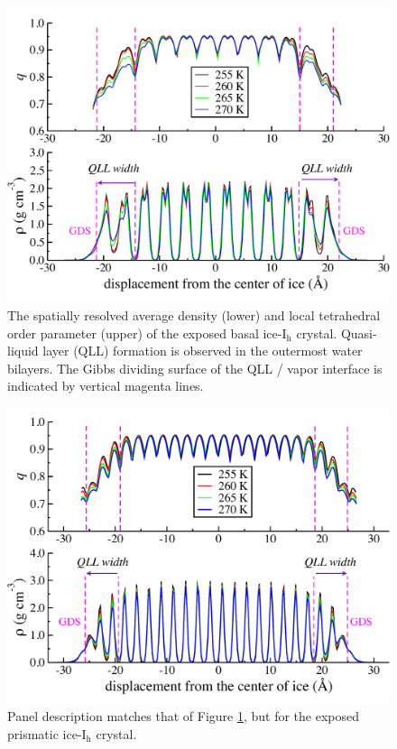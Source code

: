 \begin{figure}
\includegraphics[width=\linewidth]{Figures/basal_qdens}
\caption{\label{fig:basal_rhoq} The spatially resolved average density
  (lower) and local tetrahedral order parameter (upper) of the
  exposed basal ice-I$_\mathrm{h}$ crystal. Quasi-liquid layer (QLL)
  formation is observed in the outermost water bilayers. The Gibbs
  dividing surface of the QLL / vapor interface is indicated by
  vertical magenta lines. }
\end{figure}                


\begin{figure}
\includegraphics[width=\linewidth]{Figures/prism_qdens}
\caption{\label{fig:prism_rhoq} Panel description matches that of
  Figure \ref{fig:basal_rhoq}, but for the exposed prismatic
  ice-I$_\mathrm{h}$ crystal. }
\end{figure}                

